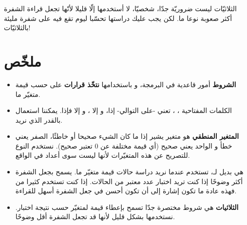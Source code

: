 الثلاثيّات ليست ضروريّة جدّا، شخصيّا، لا أستخدمها إلّا قليلا لأنّها تجعل قراءة الشفرة أكثر صعوبة نوعا ما. لكن يجب عليك دراستها تحسّبا ليوم تقع فيه على شفرة مليئة بالثلاثيّات!

\section*{ملخّص}

\begin{itemize}
	\item \textbf{الشروط}
	أمور قاعدية في البرمجة، و باستخدامها 
	\textbf{نتخّذ قرارات}
	 على حسب قيمة متغيّر ما.
	\item الكلمات المفتاحية
	 ،
	 ،
	 تعني -على التوالي- إذا، و إلا ، و إلا فإذا. يمكننا استعمال
	 بالقدر الذي نريد.
	 \item \textbf{المتغير المنطقي}
	 هو متغير يشير إذا ما كان الشيء صحيحا أو خاطئًا، الصفر يعني خطأ و الواحد يعني صحيح (أي قيمة مختلفة عن 0 تعتبر صحيح). نستخدم النوع
	 للتصريح عن هذه المتغيّرات لأنها ليست سوى أعداد في الواقع.
	 \item {}
	 هي بديل لـ،
	  تستخدم عندما نريد دراسة حالات قيمة متغيّر ما. يسمح بجعل الشفرة أكثر وضوحًا إذا كنت تريد اختبار عدد معتبر من الحالات. إذا كنت تستخدم كثيرا من
	 فهذه عادة ما تكون إشارة إلى أن 
	 تكون أحسن في جعل الشفرة أسهل للقراءة.
	 \item \textbf{الثلاثيات} 
	 هي شروط مختصرة جدّا تسمح بإعطاء قيمة لمتغيّر حسب نتيجة اختبار. نستخدمها بشكل قليل لأنها قد تجعل الشفرة أقل وضوحًا.
\end{itemize}
